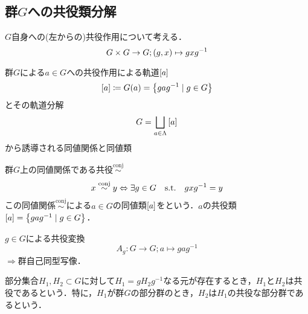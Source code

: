 \documentclass[main]{subfiles}
\begin{document}
	\subsection{群$G$への共役類分解}
		\begin{screen}
			$G$自身への(左からの)共役作用について考える．
			\[G\times G\to G;\qty(g,x)\mapsto gxg^{-1}\]
		\end{screen}
		群$G$による$a\in G$への共役作用による軌道$\qty[a]$
		\[\qty[a]\coloneqq G\qty(a)=\qty{gag^{-1}\mid g\in G}\]
		とその軌道分解
		\[G=\bigsqcup_{a\in\Lambda}\qty[a]\]
		から誘導される同値関係と同値類
		\begin{dfn}
			群$G$上の同値関係である共役$\stackrel{\text{conj}}{\sim}$
			\[x\stackrel{\text{conj}}{\sim}y\Leftrightarrow\exists g\in G\text{\quad s.t.\quad} gxg^{-1}=y\]
			この同値関係$\stackrel{\text{conj}}{\sim}$による$a\in G$の同値類$\qty[a]$をという．$a$の共役類$\qty[a]=\qty{gag^{-1}\mid g\in G}$．
		\end{dfn}
		\begin{dfn}[共役変換]
			$g\in G$による共役変換
			\[A_g:G\to G;a\mapsto gag^{-1}\]
			$\Rightarrow$群自己同型写像．
		\end{dfn}
		\begin{dfn}[共役．共役部分群]
			部分集合$H_1,H_2\subset G$に対して$H_1=gH_2g^{-1}$なる元が存在するとき，$H_1$と$H_2$は共役であるという．特に，$H_1$が群$G$の部分群のとき，$H_2$は$H_1$の共役な部分群であるという．
		\end{dfn}
\end{document}
